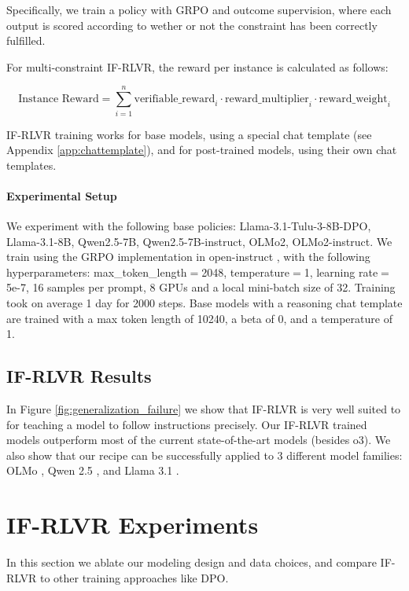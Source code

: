 \documentclass{article}
\begin{document}
Specifically, we train a policy with GRPO and outcome supervision, where each output is scored according to wether or not the constraint has been correctly fulfilled. 


For multi-constraint IF-RLVR, the reward per instance is calculated as follows:

\begin{equation}
\text{Instance Reward} = \sum_{i=1}^{n} \text{verifiable\_reward}_i \cdot \text{reward\_multiplier}_i \cdot \text{reward\_weight}_i
\label{eq:multi-reward}
\end{equation}

IF-RLVR training works for base models, using a special chat template (see Appendix \ref{app:chattemplate}), and for post-trained models, using their own chat templates.

\paragraph{Experimental Setup}
We experiment with the following base policies: Llama-3.1-Tulu-3-8B-DPO, Llama-3.1-8B, Qwen2.5-7B, Qwen2.5-7B-instruct, OLMo2, OLMo2-instruct.
We train using the GRPO implementation in open-instruct \cite{Ivison2023CamelsIA, lambert2024t}, with the following hyperparameters: max\_token\_length$=$2048, temperature$=$1, learning rate$=$5e-7, 16 samples per prompt, 8 GPUs and a local mini-batch size of 32. Training took on average 1 day for 2000 steps.
Base models with a reasoning chat template are trained with a max token length of 10240, a beta of 0, and a temperature of 1.

\subsection{IF-RLVR Results}
In Figure \ref{fig:generalization_failure} we show that IF-RLVR is very well suited to for teaching a model to follow instructions precisely. Our IF-RLVR trained models outperform most of the current state-of-the-art models (besides o3). We also show that our recipe can be successfully applied to 3 different model families: OLMo \cite{olmo20242}, Qwen 2.5 \cite{team2024qwen2}, and Llama 3.1 \cite{touvron2023llama}.


\section{IF-RLVR Experiments}
In this section we ablate our modeling design and data choices, and compare IF-RLVR to other training approaches like DPO.
\end{document}
